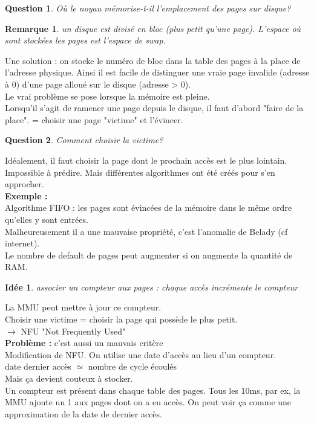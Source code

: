 \documentclass[12pt,a4paper]{report}
\newtheorem*{rem}{Remarque}
\newtheorem*{q}{Question}
\newtheorem*{id}{Idée}
\begin{document}
\begin{q}Où le noyau mémorise-t-il l'emplacement des pages sur disque?\end{q}
\begin{rem}un disque est divisé en bloc (plus petit qu'une page). L'espace où sont stockées les pages est l'espace de swap.\end{rem}

Une solution : on stocke le numéro de bloc dans la table des pages à la place de l'adresse physique. Ainsi il est facile de distinguer une vraie page invalide (adresse à 0) d'une page alloué sur le disque (adresse  > 0).\\

Le vrai problème se pose lorsque la mémoire est pleine.\\
Lorsqu'il s'agit de ramener une page depuis le disque, il faut d'abord "faire de la place". = choisir une page "victime" et l'évincer.\\

\begin{q}Comment choisir la victime?\end{q}
Idéalement, il faut choisir la page dont le prochain accès est le plus lointain. \\
Impossible à prédire. Mais différentes algorithmes ont été créés pour s'en approcher.\\

\textbf{Exemple :} \\
Algorithme FIFO : les pages sont évincées de la mémoire dans le même ordre qu'elles y sont entrées.\\
Malheureusement il a une mauvaise propriété, c'est l'anomalie de Belady (cf internet).\\
Le nombre de default de pages peut augmenter si on augmente la quantité de RAM.\\

\begin{id}associer un compteur aux pages : chaque accès incrémente le compteur\end{id}
La MMU peut mettre à jour ce compteur.\\
Choisir une victime = choisir la page qui possède le plus petit.\\
$\rightarrow$ NFU "Not Frequently Used" \\
\textbf{Problème :} c'est aussi un mauvais critère\\

Modification de NFU. On utilise une date d'accès au lieu d'un compteur.\\
date dernier accès $\simeq$ nombre de cycle écoulés\\
Mais ça devient couteux à stocker.\\
Un compteur est présent dans chaque table des pages. Tous les 10ms, par ex, la MMU ajoute un 1 aux pages dont on a eu accès. On peut voir ça comme une approximation de la date de dernier accès.\\
\end{document}
